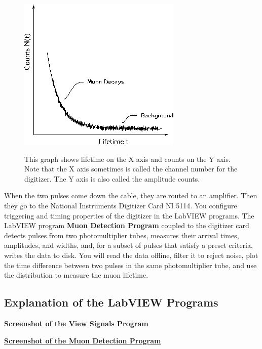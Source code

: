 \documentclass{../lab}
\begin{document}
\begin{figure}[h]
    \centering
    \href{http://experimentationlab.berkeley.edu/sites/default/files/images/MUOimage008.gif}{\includegraphics[width=0.5\linewidth]{images/MUOimage008.png}}
    \caption{This graph shows lifetime on the X axis and counts on the Y axis. Note that the X axis  sometimes is called the channel number for the digitizer. The Y axis is also called the amplitude counts.}
    \label{fig:MUOimage008}
\end{figure}

When the two pulses come down the cable, they are routed to an amplifier. Then they go to the National Instruments Digitizer Card NI 5114. You configure triggering and timing properties of the digitizer in the LabVIEW programs. The LabVIEW program \textbf{Muon Detection Program} coupled to the digitizer card detects pulses from two photomultiplier tubes, measures their arrival times, amplitudes, and widths, and, for a subset of pulses that satisfy a preset criteria, writes the data to disk. You will read the data offline, filter it to reject noise, plot the time difference between two pulses in the same photomultiplier tube, and use the distribution to measure the muon lifetime.

\subsection{Explanation of the LabVIEW Programs}

\href{http://experimentationlab.berkeley.edu/sites/default/files/Muon/Viewsignalsprogram.png}{\textbf{Screenshot of the View Signals Program}}

\noindent\href{http://experimentationlab.berkeley.edu/sites/default/files/Muon/MUONdetectionprogram\_2.png}{\textbf{Screenshot of the Muon Detection Program}}

\newpage
\end{document}

